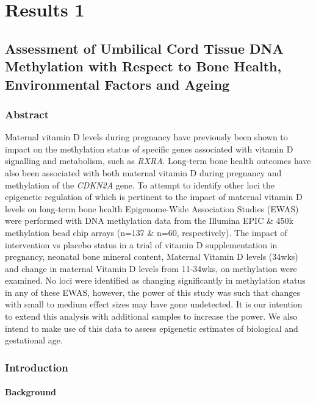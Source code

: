 \documentclass[]{book}
\begin{document}
\hypertarget{part-results-1}{%
\part{Results 1}\label{part-results-1}}

\hypertarget{MAVIDOS}{%
\chapter{Assessment of Umbilical Cord Tissue DNA Methylation with Respect to Bone Health, Environmental Factors and Ageing}\label{MAVIDOS}}

\hypertarget{abstract-1}{%
\section{Abstract}\label{abstract-1}}

Maternal vitamin D levels during pregnancy have previously been shown to impact on the methylation status of specific genes associated with vitamin D signalling and metabolism, such as \emph{RXRA}. Long-term bone health outcomes have also been associated with both maternal vitamin D during pregnancy and methylation of the \emph{CDKN2A} gene. To attempt to identify other loci the epigenetic regulation of which is pertinent to the impact of maternal vitamin D levels on long-term bone health Epigenome-Wide Association Studies (EWAS) were performed with DNA methylation data from the Illumina EPIC \& 450k methylation bead chip arrays (n=137 \& n=60, respectively). The impact of intervention vs placebo status in a trial of vitamin D supplementation in pregnancy, neonatal bone mineral content, Maternal Vitamin D levels (34wks) and change in maternal Vitamin D levels from 11-34wks, on methylation were examined. No loci were identified as changing significantly in methylation status in any of these EWAS, however, the power of this study was such that changes with small to medium effect sizes may have gone undetected. It is our intention to extend this analysis with additional samples to increase the power. We also intend to make use of this data to assess epigenetic estimates of biological and gestational age.

\hypertarget{introduction}{%
\section{Introduction}\label{introduction}}

\hypertarget{background}{%
\subsection{Background}\label{background}}
\end{document}
